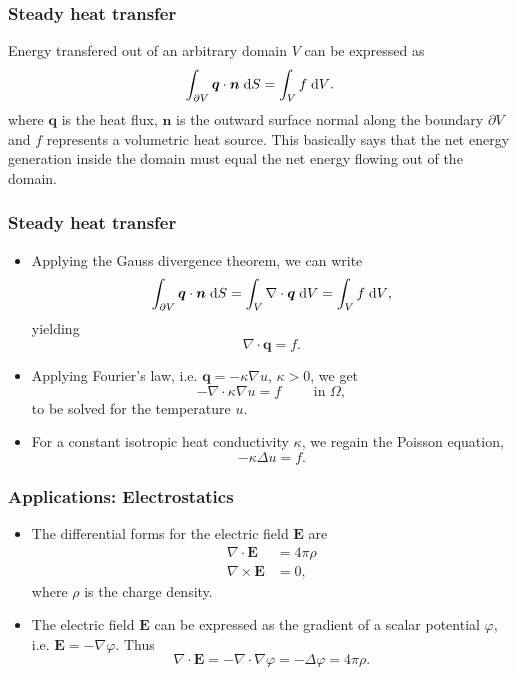 \begin{frame}[fragile]
  \frametitle{Steady heat transfer}
  Energy transfered out of an arbitrary domain $V$ can be expressed as
  \[
    \int_{\partial V} \bm q \cdot \bm n {\;\text{d}S} = \int_V f {\;\text{d}V}.
  \]
  where $\bm q$ is the heat flux, $\bm n$ is the outward surface normal along
  the boundary $\partial V$ and $f$ represents a volumetric heat source. This
  basically says that the net energy generation inside the domain must equal the
  net energy flowing out of the domain.
  \begin{center}
    
  \end{center}
\end{frame}

\begin{frame}[fragile]
  \frametitle{Steady heat transfer}
  \begin{itemize}
  \item Applying the Gauss divergence theorem, we can write
    \[
      \int_{\partial V} \bm q \cdot \bm n {\;\text{d}S}
      = \int_V \nabla \cdot \bm q {\;\text{d}V}
      = \int_V f {\;\text{d}V},
    \]
    yielding
    \[
      \nabla \cdot \bm q = f.
    \]
  \item Applying Fourier's law, i.e. $\bm q = -\kappa \nabla u$, $\kappa > 0$,
    we get
    \[
      - \nabla\cdot\kappa\nabla u = f \qquad \text{ in } \Omega,
    \]
    to be solved for the temperature $u$.
  \item For a constant isotropic heat conductivity $\kappa$, we regain the
    Poisson equation,
    \[
      - \kappa\Delta u = f.
    \]
  \end{itemize}
\end{frame}

\begin{frame}[fragile]
  \frametitle{Applications: Electrostatics}
  \begin{itemize}
  \item The differential forms for the electric field $\bm E$ are
    \[
      \begin{split}
        \nabla \cdot \bm E &= 4\pi\rho \\
        \nabla \times \bm E &= 0,
      \end{split}
    \]
    where $\rho$ is the charge density.
  \item The electric field $\bm E$ can be expressed as the gradient of
    a scalar potential $\varphi$, i.e. $\bm E = -\nabla\varphi$. Thus
    \[
      \nabla \cdot \bm E = -\nabla\cdot\nabla\varphi = -\Delta\varphi = 4\pi\rho.
    \]
  \end{itemize}
\end{frame}

